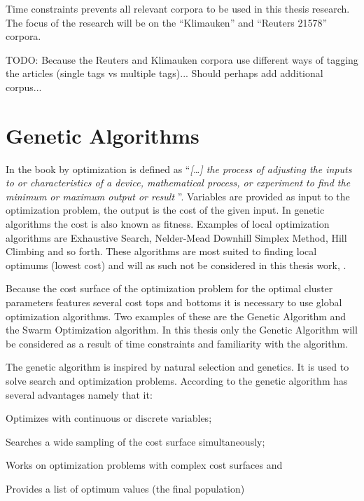 Time constraints prevents all relevant corpora to be used in this thesis research. The focus of the research will be on the ``Klimauken'' and ``Reuters 21578'' corpora. 

TODO: Because the Reuters and Klimauken corpora use different ways of tagging the articles (single tags vs multiple tags)... Should perhaps add additional corpus...


\section{Genetic Algorithms}
\label{GeneticAlgorithm}
In the book  by \cite{Haupt2004} optimization is defined as ``\textit{[\dots] the process of adjusting the inputs to or characteristics of a device, mathematical process, or experiment to find the minimum or maximum output or result }''. Variables are provided as input to the optimization problem, the output is the cost of the given input. In genetic algorithms the cost is also known as fitness. Examples of local optimization algorithms are Exhaustive Search, Nelder-Mead Downhill Simplex Method, Hill Climbing and so forth. These algorithms are most suited to finding local optimums (lowest cost) and will as such not be considered in this thesis work, \parencite{Haupt2004}.

Because the cost surface of the optimization problem for the optimal \CTC cluster parameters features several cost tops and bottoms it is necessary to use global optimization algorithms. Two examples of these are the Genetic Algorithm and the Swarm Optimization algorithm. In this thesis only the Genetic Algorithm will be considered as a result of time constraints and familiarity with the algorithm.

The genetic algorithm is inspired by natural selection and genetics. It is used to solve search and optimization problems. According to \citeauthor[23]{Haupt2004} the genetic algorithm has several advantages namely that it:
\begin{inparaenum}[\itshape 1\upshape)]
\item Optimizes with continuous or discrete variables;
\item Searches a wide sampling of the cost surface simultaneously;
\item Works on optimization problems with complex cost surfaces and
\item Provides a list of optimum values (the final population) 
\end{inparaenum}


